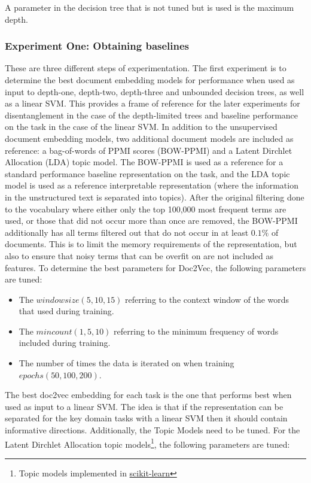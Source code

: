 A parameter in the decision tree that is not tuned but is used is the maximum depth.

\subsubsection{Experiment One: Obtaining baselines}

These are three different steps of experimentation. The first experiment is to determine the best document embedding models for performance when used as input to depth-one, depth-two, depth-three and unbounded decision trees, as well as a linear SVM.  This provides a frame of reference for the later experiments for disentanglement in the case of the depth-limited trees and baseline performance on the task in the case of the linear SVM. In addition to the unsupervised document embedding models, two additional document models are included as reference: a bag-of-words of PPMI scores (BOW-PPMI) and a Latent Dirchlet Allocation (LDA) topic model. The BOW-PPMI is used as a reference for a standard performance baseline representation on the task, and the LDA topic model is used as a reference interpretable representation (where the information in the unstructured text is separated into topics). After the original filtering done to the vocabulary where either only the top 100,000 most frequent terms are used, or those that did not occur more than once are removed, the BOW-PPMI additionally has all terms filtered out that do not occur in at least $0.1\%$ of documents. This is to limit the memory requirements of the representation, but also to ensure that noisy terms that can be overfit on are not included as features.   To determine the best parameters for Doc2Vec, the following parameters are tuned: 

\begin{itemize}
	\item The ${window size} (5, 10, 15)$ referring to the context window of the words that  used   during training.
	\item The ${min count} (1, 5, 10)$ referring to the minimum frequency of words  included during training.
	\item The number of times the data is iterated on when training ${epochs} (50, 100, 200)$.
\end{itemize}

The best doc2vec embedding for each task is the one that performs best when used as input to a linear SVM. The idea is that if the representation can be separated for the key domain tasks with a linear SVM then it should contain informative directions. Additionally, the Topic Models need to be tuned. For the Latent Dirchlet Allocation topic models\footnote{Topic models implemented in \href{https://scikit-learn.org/stable/modules/generated/sklearn.decomposition.LatentDirichletAllocation.html}{scikit-learn}}, the following parameters are tuned:

